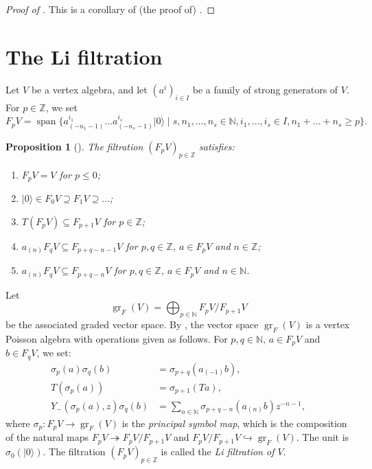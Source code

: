 \documentclass[a4paper, 12pt, reqno]{amsart}
\newtheorem{proposition}[theorem]{Proposition}
\theoremstyle{remark}
\DeclareMathOperator{\gr}{gr}
\DeclareMathOperator{\vspan}{span}
\newcommand{\vac}{{|0\rangle}}
\begin{document}
\begin{proof}[Proof of ]
  This is a corollary of (the proof of) .
\end{proof}

\section{The Li filtration}
\label{sec:li-filtr}

Let $V$ be a vertex algebra, and let $(a^i)_{i \in I}$ be a family of strong generators of $V$.
For $p \in \mathbb{Z}$, we set
\begin{equation*}
  F_pV = \vspan\{a^{i_1}_{(-n_1 - 1)}\dots a^{i_s}_{(-n_s - 1)}\vac \mid s, n_1, \dots, n_s \in \mathbb{N}, i_1, \dots, i_s \in I, n_1 + \dots + n_s \ge p\}.
\end{equation*}

\begin{proposition}[{\cite{li_abelianizing_2005}}]
  \label{prp:4}
  The filtration $(F_pV)_{p \in \mathbb{Z}}$ satisfies:
  \begin{enumerate}
  \item $F_pV = V$ for $p \le 0$;
  \item $\vac \in F_0V \supseteq F_1V \supseteq \dots$;
  \item $T(F_pV) \subseteq F_{p + 1}V$ for $p \in \mathbb{Z}$;
  \item $a_{(n)}F_qV \subseteq F_{p + q - n - 1}V$ for $p, q \in \mathbb{Z}$, $a \in F_pV$ and $n \in \mathbb{Z}$;
  \item $a_{(n)}F_qV \subseteq F_{p + q - n}V$ for $p, q \in \mathbb{Z}$, $a \in F_pV$ and $n \in \mathbb{N}$.
  \end{enumerate}
\end{proposition}

Let
\begin{equation*}
  \gr_F(V) = \bigoplus_{p \in \mathbb{N}}F_pV/F_{p + 1}V
\end{equation*}
be the associated graded vector space.
By \cite{li_abelianizing_2005}, the vector space $\gr_F(V)$ is a vertex Poisson algebra with operations given as follows.
For $p, q \in \mathbb{N}$, $a \in F_pV$ and $b \in F_qV$, we set:
\begin{align*}
  \sigma_p(a)\sigma_q(b) &= \sigma_{p + q}(a_{(-1)}b), \\
  T(\sigma_p(a)) &= \sigma_{p + 1}(Ta), \\
  Y_-(\sigma_p(a), z)\sigma_q(b) &= \sum_{n \in \mathbb{N}}\sigma_{p + q - n}(a_{(n)}b)z^{-n - 1},
\end{align*}
where $\sigma_p: F_pV \to \gr_F(V)$ is the \emph{principal symbol map}, which is the composition of the natural maps $F_pV \twoheadrightarrow F_pV/F_{p + 1}V$ and $F_pV/F_{p + 1}V \hookrightarrow \gr_F(V)$.
The unit is $\sigma_0(\vac)$.
The filtration $(F_pV)_{p \in \mathbb{Z}}$ is called the \emph{Li filtration of $V$}.
\end{document}
